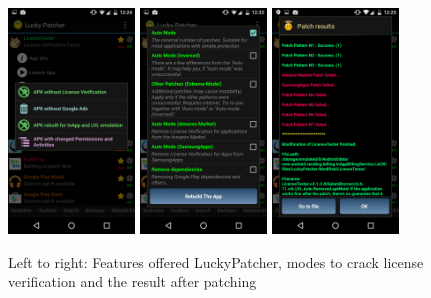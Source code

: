 \begin{figure}[h]
    \centering
    \includegraphics[width=0.3\textwidth]{data/luckyFeatures.png}
    \includegraphics[width=0.3\textwidth]{data/luckyModi.png}
    \includegraphics[width=0.3\textwidth]{data/luckyPatching.png}
    \caption{Left to right: Features offered LuckyPatcher, modes to crack license verification and the result after patching}
    \label{fig:luckyScreen}
\end{figure}

